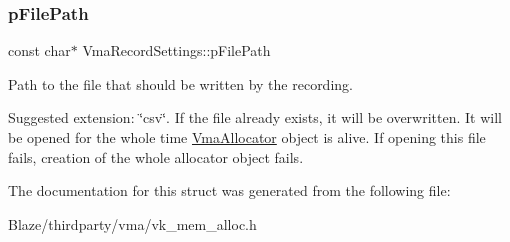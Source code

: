 \subsubsection{\texorpdfstring{p\+File\+Path}{pFilePath}}
{\footnotesize\ttfamily const char$\ast$ Vma\+Record\+Settings\+::p\+File\+Path}



Path to the file that should be written by the recording. 

Suggested extension\+: \char`\"{}csv\char`\"{}. If the file already exists, it will be overwritten. It will be opened for the whole time \hyperlink{structVmaAllocator}{Vma\+Allocator} object is alive. If opening this file fails, creation of the whole allocator object fails. 

The documentation for this struct was generated from the following file\+:\begin{DoxyCompactItemize}
\item 
Blaze/thirdparty/vma/vk\+\_\+mem\+\_\+alloc.\+h\end{DoxyCompactItemize}
